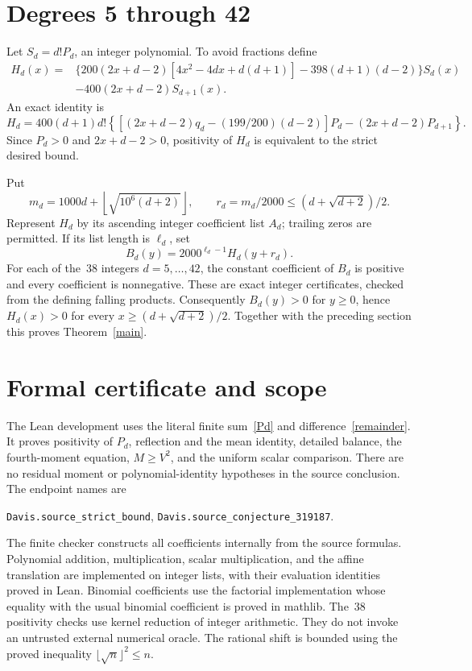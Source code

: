\documentclass[11pt]{article}
\begin{document}
\section{Degrees 5 through 42}
Let $S_d=d!P_d$, an integer polynomial. To avoid fractions define
\begin{align*}
 H_d(x)={}&\{200(2x+d-2)[4x^2-4dx+d(d+1)]
                   -398(d+1)(d-2)\}S_d(x)\\
          &-400(2x+d-2)S_{d+1}(x).
\end{align*}
An exact identity is
\begin{equation}
 H_d=400(d+1)d!\left\{
    [(2x+d-2)q_d-(199/200)(d-2)]P_d-(2x+d-2)P_{d+1}\right\}.
\end{equation}
Since $P_d>0$ and $2x+d-2>0$, positivity of $H_d$ is equivalent to
the strict desired bound.

Put
\[
 m_d=1000d+\left\lfloor\sqrt{10^6(d+2)}\right\rfloor,
 \qquad r_d=m_d/2000\le(d+\sqrt{d+2})/2.
\]
Represent $H_d$ by its ascending integer coefficient list $A_d$;
trailing zeros are permitted. If its list length is $\ell_d$, set
\[
 B_d(y)=2000^{\ell_d-1}H_d(y+r_d).
\]
For each of the~38 integers $d=5,\ldots,42$, the constant coefficient
of $B_d$ is positive and every coefficient is nonnegative.
These are exact integer certificates, checked from the defining falling
products. Consequently $B_d(y)>0$ for $y\ge0$, hence $H_d(x)>0$
for every $x\ge(d+\sqrt{d+2})/2$. Together with the preceding section
this proves Theorem~\ref{main}.

\newpage
\section{Formal certificate and scope}
The Lean development uses the literal finite sum~\eqref{Pd} and
difference~\eqref{remainder}. It proves positivity of $P_d$, reflection
and the mean identity, detailed balance, the fourth-moment equation,
$M\ge V^2$, and the uniform scalar comparison. There are no residual
moment or polynomial-identity hypotheses in the source conclusion.
The endpoint names are
\begin{center}
\texttt{Davis.source\_strict\_bound},\qquad
\texttt{Davis.source\_conjecture\_319187}.
\end{center}
The finite checker constructs all coefficients internally from the
source formulas. Polynomial addition, multiplication, scalar multiplication,
and the affine translation are implemented on integer lists, with their
evaluation identities proved in Lean. Binomial coefficients use the
factorial implementation whose equality with the usual binomial coefficient
is proved in mathlib. The~38 positivity checks use kernel reduction
of integer arithmetic. They do not invoke an untrusted external numerical
oracle. The rational shift is bounded using the proved inequality
$\lfloor\sqrt n\rfloor^2\le n$.
\end{document}

